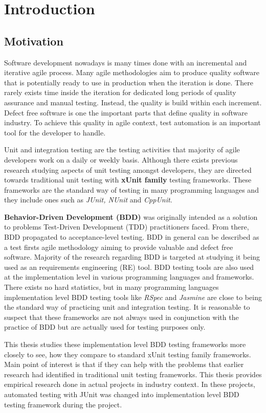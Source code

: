 \chapter{Introduction}
\label{chapter:intro}
\section{Motivation}
Software development nowadays is many times done with an incremental and iterative agile process.
Many agile methodologies aim to produce quality software that is potentially ready to use in production when the iteration
is done. There rarely exists time inside the iteration for dedicated long periods of quality assurance and manual testing.
Instead, the quality is build within each increment. Defect free software is one the important parts that define
quality in software industry. To achieve this quality in agile context, test automation is
an important tool for the developer to handle.

Unit and integration testing are the testing activities that majority of agile developers work on a daily or weekly basis.
Although there exists previous research studying aspects of unit testing amongst developers, they are directed
towards traditional unit testing with \textbf{xUnit family} testing frameworks. These frameworks are the standard way of testing
in many programming languages and they include ones such as \textit{JUnit, NUnit} and \textit{CppUnit}.

\textbf{Behavior-Driven Development (BDD)} was originally intended as a solution to problems Test-Driven Development (TDD) practitioners
faced. From there, BDD propagated to acceptance-level testing. BDD in general can be described as a test firsts agile methodology
aiming to provide valuable and defect free software.
Majority of the research regarding BDD is targeted at studying
it being used as an requirements engineering (RE) tool. BDD testing tools are also used at the implementation level in various
programming languages and frameworks. There exists no hard statistics, but in many programming languages implementation level BDD
testing tools like \textit{RSpec} and \textit{Jasmine} are close to being the standard way of practicing unit and integration testing.
It is reasonable to suspect that these frameworks are not always used in conjunction with the practice of BDD but are actually used for testing
purposes only.

This thesis studies these implementation level BDD testing frameworks more closely to see, how they compare to
standard xUnit testing family frameworks. Main point of interest is that if they can help with the problems that earlier research
had identified in traditional unit testing frameworks. This thesis provides empirical research done in actual projects in industry context.
In these projects, automated testing with JUnit was changed into implementation level BDD testing framework during the project.

